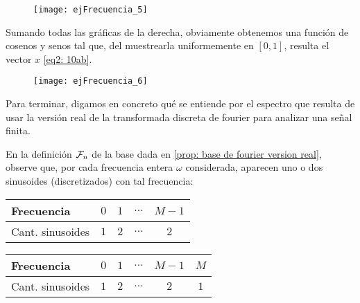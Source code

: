 \begin{ejemplo}
\begin{figure}[H]
	\centering
	\texttt{[image: ejFrecuencia\_5]} 
\end{figure}	

Sumando todas las gráficas de la derecha, obviamente
obtenemos una función de cosenos y senos tal que,
del muestrearla uniformemente en $[0,1]$, resulta
el vector $x$ \eqref{eq2: 10ab}.

\begin{figure}[H]
	\centering
	\texttt{[image: ejFrecuencia\_6]} 
\end{figure}	
\final
\end{ejemplo}

Para terminar, digamos en concreto qué se entiende
por el espectro que resulta de usar la 
versión real de la transformada
discreta de fourier para analizar una señal finita.

En la definición 
$\mathcal{F}_{n}$ de la base dada en 
\ref{prop: base de fourier version real}, observe que, 
por cada frecuencia entera $\omega$ considerada,
aparecen uno o dos sinusoides (discretizados) con tal frecuencia:


\begin{table}[ht]
\centering
  \begin{tabular}{ l | c | c | c | c }
    \hline
    Frecuencia & $0$ & $1$ & $\ldots$ & $M-1$  \\ \hline
    Cant. sinusoides  & $1$ & $2$ & $\ldots$ & $2$ \\
    \hline
  \end{tabular}
\label{Tab: frecuencias TDF n impar}
\end{table}

\vspace{2cm}

\begin{table}[ht]
\centering
  \begin{tabular}{ l | c | c | c | c | c}
    \hline
    Frecuencia & $0$ & $1$ & $\ldots$ & $M-1$ & $M$  \\ \hline
    Cant. sinusoides  & $1$ & $2$ & $\ldots$ & $2$ & $1$ \\
    \hline
  \end{tabular}
\label{Tab: frecuencias TDF n par}
\end{table}

